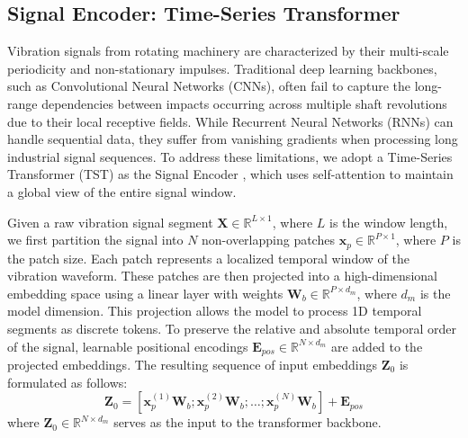 \subsection{Signal Encoder: Time-Series Transformer}
Vibration signals from rotating machinery are characterized by their multi-scale periodicity and non-stationary impulses. Traditional deep learning backbones, such as Convolutional Neural Networks (CNNs), often fail to capture the long-range dependencies between impacts occurring across multiple shaft revolutions due to their local receptive fields. While Recurrent Neural Networks (RNNs) can handle sequential data, they suffer from vanishing gradients when processing long industrial signal sequences. To address these limitations, we adopt a Time-Series Transformer (TST) as the Signal Encoder \cite{zerveas2021transformer}, which uses self-attention to maintain a global view of the entire signal window.

Given a raw vibration signal segment $\mathbf{X} \in \mathbb{R}^{L \times 1}$, where $L$ is the window length, we first partition the signal into $N$ non-overlapping patches $\mathbf{x}_p \in \mathbb{R}^{P \times 1}$, where $P$ is the patch size. Each patch represents a localized temporal window of the vibration waveform. These patches are then projected into a high-dimensional embedding space using a linear layer with weights $\mathbf{W}_b \in \mathbb{R}^{P \times d_m}$, where $d_m$ is the model dimension. This projection allows the model to process 1D temporal segments as discrete tokens. To preserve the relative and absolute temporal order of the signal, learnable positional encodings $\mathbf{E}_{pos} \in \mathbb{R}^{N \times d_m}$ are added to the projected embeddings. The resulting sequence of input embeddings $\mathbf{Z}_0$ is formulated as follows:
\begin{equation}
\mathbf{Z}_0 = [\mathbf{x}_p^{(1)}\mathbf{W}_b; \mathbf{x}_p^{(2)}\mathbf{W}_b; \dots; \mathbf{x}_p^{(N)}\mathbf{W}_b] + \mathbf{E}_{pos}
\end{equation}
where $\mathbf{Z}_0 \in \mathbb{R}^{N \times d_m}$ serves as the input to the transformer backbone.


